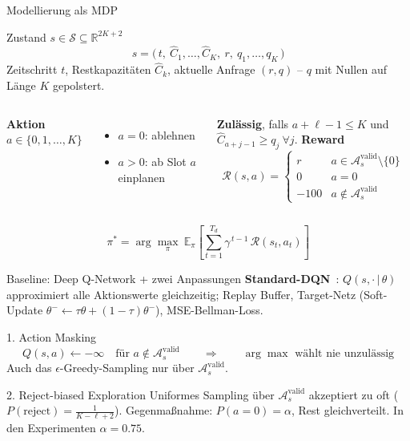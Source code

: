 \documentclass[aspectratio=169, 11pt]{beamer}
\newcommand{\Chat}{\hat{C}}
\newcommand{\Avalid}{\mathcal{A}^{\text{valid}}_s}
\begin{document}
\begin{frame}{Modellierung als MDP}
  \begin{block}{Zustand $s \in \mathcal{S} \subseteq \mathbb{R}^{2K+2}$}
    \[
      s = \bigl(\,t,\ \Chat_1,\dots,\Chat_K,\ r,\ q_1,\dots,q_K\,\bigr)
    \]
    Zeitschritt $t$, Restkapazitäten $\Chat_k$, aktuelle Anfrage $(r,q)$ -- $q$ mit Nullen auf Länge $K$ gepolstert.
  \end{block}

  \begin{columns}[T]
      \textbf{Aktion} $a \in \{0,1,\dots,K\}$
      \begin{itemize}
        \item $a=0$: ablehnen
        \item $a>0$: ab Slot $a$ einplanen
      \end{itemize}
      \textbf{Zulässig}, falls $a+\ell-1 \le K$ und $\Chat_{a+j-1}\ge q_j\ \forall j$.
      \textbf{Reward}
      \[
        \mathcal{R}(s,a)=
        \begin{cases}
          r    & a \in \Avalid \setminus\{0\}\\
          0    & a = 0\\
          -100 & a \notin \Avalid
        \end{cases}
      \]
  \end{columns}

  \medskip
  \[
    \pi^* = \arg\max_{\pi}\ \mathbb{E}_{\pi}\!\left[\sum_{t=1}^{T_d}\gamma^{\,t-1}\,\mathcal{R}(s_t,a_t)\right]
  \]
\end{frame}

\begin{frame}{Baseline: Deep Q-Network + zwei Anpassungen}
  \textbf{Standard-DQN}~\cite{mnih2015}: $Q(s,\cdot\,|\,\theta)$ approximiert alle Aktionswerte gleichzeitig;
  Replay Buffer, Target-Netz (Soft-Update $\theta^-\!\leftarrow\tau\theta+(1-\tau)\theta^-$), MSE-Bellman-Loss.

  \begin{block}{1. Action Masking}
    \[
      Q(s,a) \leftarrow -\infty \quad\text{für } a \notin \Avalid
      \qquad\Rightarrow\qquad \arg\max \text{ wählt nie unzulässig}
    \]
    Auch das $\epsilon$-Greedy-Sampling nur über $\Avalid$.
  \end{block}

  \begin{block}{2. Reject-biased Exploration}
    Uniformes Sampling über $\Avalid$ akzeptiert zu oft ($P(\text{reject})=\tfrac{1}{K-\ell+2}$).
    Gegenmaßnahme: $P(a{=}0)=\alpha$, Rest gleichverteilt. In den Experimenten $\alpha = 0.75$.
  \end{block}
\end{frame}
\end{document}
